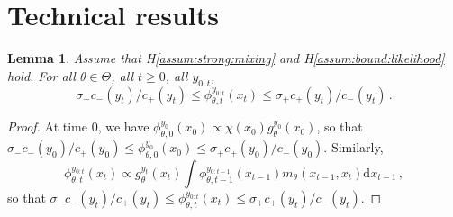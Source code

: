 \documentclass{article}
\newtheorem{lemma}[theorem]{Lemma}
\newcommand{\1}{\mathbbm{1}}
\newcommand{\rmd}{\ensuremath{\mathrm{d}}}
\begin{document}
\section{Technical results}
\begin{lemma}
\label{lem:bound:filter}
Assume that H\ref{assum:strong:mixing} and H\ref{assum:bound:likelihood} hold. For all $\theta\in\Theta$,  all $t\geq 0$, all $y_{0:t}$,
$$
\sigma_- c_-(y_t)/c_+(y_t)\leq \phi^{y_{0:t}}_{\theta,t}(x_{t})\leq \sigma_+ c_+(y_t)/c_-(y_t)\,.
$$
\end{lemma}
\begin{proof}
At time 0, we have $\phi^{y_{0}}_{\theta,0}(x_{0}) \propto \chi(x_0)g^{y_0}_\theta(x_0)$, so that $\sigma_- c_-(y_0)/c_+(y_0)\leq \phi^{y_{0}}_{\theta,0}(x_{0})\leq \sigma_+ c_+(y_0)/c_-(y_0)$. Similarly, 
$$
\phi^{y_{0:t}}_{\theta,t}(x_{t}) \propto g^{y_t}_\theta(x_t)\int \phi^{y_{0:t-1}}_{\theta,t-1}(x_{t-1})m_\theta(x_{t-1},x_t)\rmd x_{t-1}\,,
$$
so that $\sigma_- c_-(y_t)/c_+(y_t)\leq \phi^{y_{0:t}}_{\theta,t}(x_{t})\leq \sigma_+ c_+(y_t)/c_-(y_t)$.
\end{proof}
\end{document}
